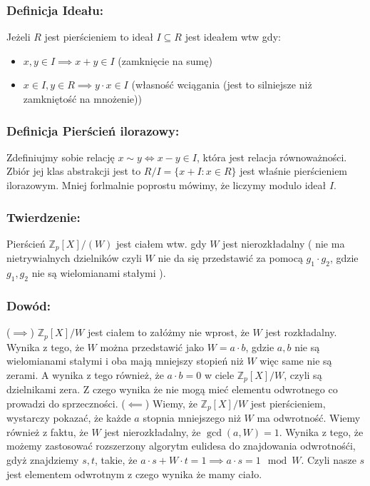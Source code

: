 \subsubsection{Definicja Ideału:}
Jeżeli $R$ jest pierścieniem to ideał $I \subseteq R$ jest ideałem wtw gdy:
\begin{itemize}
    \item $x,y \in I \implies x+y \in I$ (zamknięcie na sumę)
    \item $x \in I, y \in R \implies y\cdot x \in I$ (własność wciągania (jest to silniejsze niż zamkniętość na mnożenie))
\end{itemize}
\subsubsection{Definicja Pierścień ilorazowy:}
Zdefiniujmy sobie relację $x \sim y \iff x - y \in I$, która jest relacja równoważności. Zbiór jej klas abstrakcji jest to $R/I = \{ x + I: x\in R\}$ jest właśnie pierścieniem ilorazowym. Mniej forlmalnie poprostu mówimy, że liczymy modulo ideał $I$.
\subsubsection{Twierdzenie:}
Pierścień $\mathbb{Z}_p[X]/(W)$ jest ciałem wtw. gdy $W$ jest nierozkładalny ( nie ma nietrywialnych dzielników czyli $W$ nie da się przedstawić za pomocą $g_1\cdot g_2$, gdzie $g_1,g_2$ nie są wielomianami stałymi ).
\subsubsection{Dowód:}
($\implies$)\newline
$\mathbb{Z}_p[X]/W$ jest ciałem to załóżmy nie wprost, że $W$ jest rozkładalny. Wynika z tego, że $W$ można przedstawić jako $W = a\cdot b$, gdzie $a,b$ nie są wielomianami stałymi i oba mają mniejszy stopień niż $W$ więc same nie są zerami. A wynika z tego również, że $a\cdot b = 0$ w ciele $\mathbb{Z}_p[X]/W$, czyli są dzielnikami zera. Z czego wynika że nie mogą mieć elementu odwrotnego co prowadzi do sprzeczności.
\newline \newline
($\impliedby$) \newline
Wiemy, że $\mathbb{Z}_p[X]/W$ jest pierścieniem, wystarczy pokazać, że każde $a$ stopnia mniejszego niż $W$ ma odwrotność. Wiemy również z faktu, że $W$ jest nierozkładalny, że $\gcd(a,W) = 1$. Wynika z tego, że możemy zastosować rozszerzony algorytm eulidesa do znajdowania odwrotnośći, gdyż znajdziemy $s,t$, takie, że $a\cdot s + W\cdot t = 1 \implies a\cdot s = 1 \mod W$. Czyli nasze $s$ jest elementem odwrotnym z czego wynika że mamy ciało.